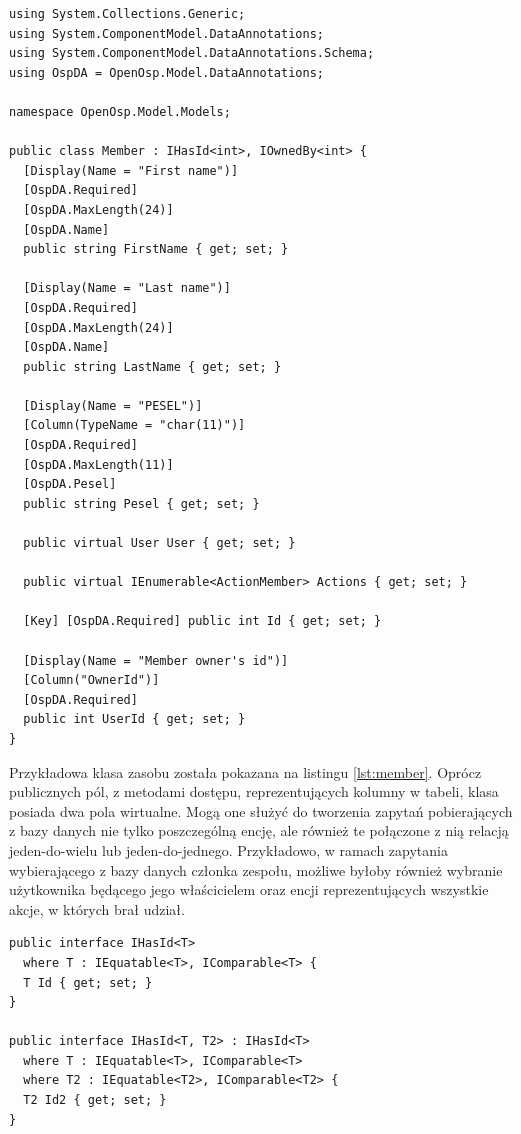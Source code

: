 \begin{lstlisting}[language=CSharp, caption=Przykładowa klasa zasobu, label=lst:member]
using System.Collections.Generic;
using System.ComponentModel.DataAnnotations;
using System.ComponentModel.DataAnnotations.Schema;
using OspDA = OpenOsp.Model.DataAnnotations;

namespace OpenOsp.Model.Models; 

public class Member : IHasId<int>, IOwnedBy<int> {
  [Display(Name = "First name")]
  [OspDA.Required]
  [OspDA.MaxLength(24)]
  [OspDA.Name]
  public string FirstName { get; set; }

  [Display(Name = "Last name")]
  [OspDA.Required]
  [OspDA.MaxLength(24)]
  [OspDA.Name]
  public string LastName { get; set; }

  [Display(Name = "PESEL")]
  [Column(TypeName = "char(11)")]
  [OspDA.Required]
  [OspDA.MaxLength(11)]
  [OspDA.Pesel]
  public string Pesel { get; set; }

  public virtual User User { get; set; }

  public virtual IEnumerable<ActionMember> Actions { get; set; }

  [Key] [OspDA.Required] public int Id { get; set; }

  [Display(Name = "Member owner's id")]
  [Column("OwnerId")]
  [OspDA.Required]
  public int UserId { get; set; }
}
\end{lstlisting}

Przykładowa klasa zasobu została pokazana na listingu \ref{lst:member}. Oprócz publicznych pól, z metodami dostępu, reprezentujących kolumny w tabeli, klasa posiada dwa pola wirtualne. Mogą one służyć do tworzenia zapytań pobierających z bazy danych nie tylko poszczególną encję, ale również te połączone z nią relacją jeden-do-wielu lub jeden-do-jednego. Przykładowo, w ramach zapytania wybierającego z bazy danych członka zespołu, możliwe byłoby również wybranie użytkownika będącego jego właścicielem oraz encji reprezentujących wszystkie akcje, w których brał udział.

\begin{lstlisting}[language=CSharp, caption={Interfejs implementowany przez klasy zasobu, posiadające klucz główny lub klucz złożony}, label=lst:hasId]
public interface IHasId<T>
  where T : IEquatable<T>, IComparable<T> {
  T Id { get; set; }
}

public interface IHasId<T, T2> : IHasId<T>
  where T : IEquatable<T>, IComparable<T>
  where T2 : IEquatable<T2>, IComparable<T2> {
  T2 Id2 { get; set; }
}
\end{lstlisting}

